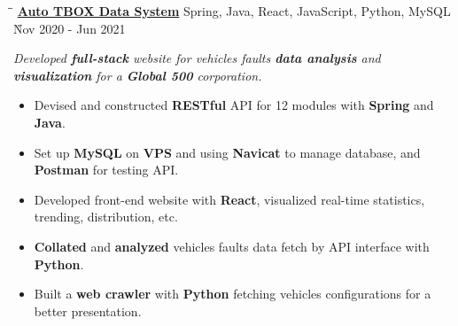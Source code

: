 \documentclass{res}
\begin{document}
\begin{resume}
    \vspace{0.00in}	 
    \begin{tabbing}
    \hspace{2.391in}\= \hspace{3in}\= \kill %
    \href{https://github.com/DolorHunter/AutoTBOXDataSystem}{\bf Auto TBOX Data System}  \> 
                Spring, Java, React, JavaScript, Python, MySQL \` Nov 2020 - Jun 2021 \\
    \end{tabbing}\vspace{-20pt}      %
    \vspace{-0.1in}
    \textit{Developed {\bf full-stack} website for vehicles faults {\bf data analysis} and
             {\bf visualization} for a {\bf Global 500} corporation.}
    \vspace{-0.1in}
    \begin{itemize} \itemsep 1.5pt %
        \item Devised and constructed {\bf RESTful} API for 12 modules with 
                {\bf Spring} and {\bf Java}.
        \item Set up {\bf MySQL} on {\bf VPS} and using {\bf Navicat} to manage database, and 
                {\bf Postman} for testing API.
        \item Developed front-end website with {\bf React}, visualized real-time statistics,  
                trending, distribution, etc.
        \item {\bf Collated} and {\bf analyzed} vehicles faults data fetch by API interface with 
                {\bf Python}.
        \item Built a {\bf web crawler} with {\bf Python} fetching vehicles configurations for 
                a better presentation.
    \end{itemize}


\end{resume}
\end{document}
